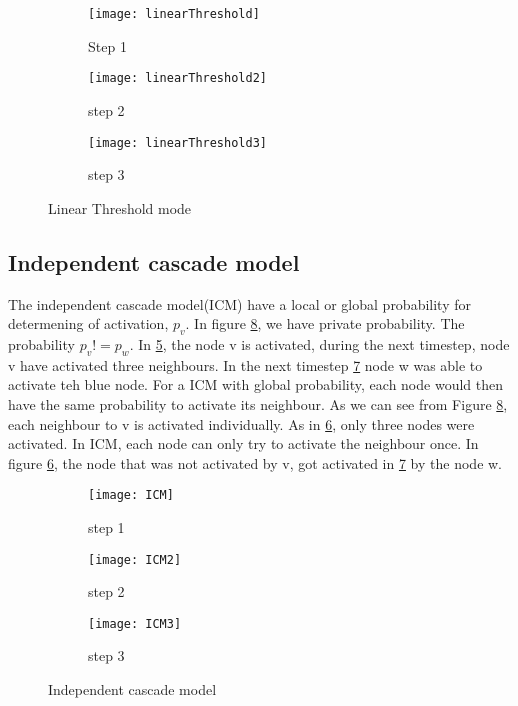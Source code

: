 {\begin{figure}[!ht]
	\begin{subfigure}{0.3\textwidth}
		\texttt{[image: linearThreshold]}
		\caption{Step 1 } 
		\label{fig:linearThresh}
	\end{subfigure}
	\begin{subfigure}{0.3\textwidth}
		\texttt{[image: linearThreshold2]}
		\caption{step 2 } 
		\label{fig:linearThresh2}
	\end{subfigure}
	\begin{subfigure}{0.3\textwidth}
		\texttt{[image: linearThreshold3]}
		\caption{step 3} 
		\label{fig:linearThresh3}
	\end{subfigure}
	\caption{Linear Threshold mode}
\end{figure}

\subsection{Independent cascade model}
The independent cascade model(ICM) have a local or global probability for determening of activation, $p_v$. In figure \ref{fig:ICM_step}, we have private probability. The probability $p_v != p_w$. In \ref{fig:ICM}, the node v is activated, during the next timestep, node v have activated three neighbours. In the next timestep \ref{fig:ICM3} node w was able to activate teh blue node. For a ICM with global probability, each node would then have the same probability to activate its neighbour. As we can see from Figure \ref{fig:ICM_step}, each neighbour to v is activated individually. As in \ref{fig:ICM2}, only three nodes were activated. In ICM, each node can only try to activate the neighbour once. In figure \ref{fig:ICM2}, the node that was not activated by v, got activated in \ref{fig:ICM3} by the node w.


\begin{figure}[!ht]
	\begin{subfigure}{0.3\textwidth}
		\texttt{[image: ICM]}
		\caption{step 1 } 
		\label{fig:ICM}
	\end{subfigure}
	\begin{subfigure}{0.3\textwidth}
		\texttt{[image: ICM2]}
		\caption{step 2} 
		\label{fig:ICM2}
	\end{subfigure}
	\begin{subfigure}{0.3\textwidth}
		\texttt{[image: ICM3]}
		\caption{step 3} 
		\label{fig:ICM3}
	\end{subfigure}
	\caption{Independent cascade model}
	\label{fig:ICM_step}
\end{figure}

}
